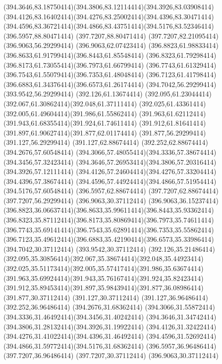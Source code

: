 {{	\curveto(394.3646,83.18750414)(394.3806,83.12114414)(394.3926,83.03908414)
	\curveto(394.4126,83.16402414)(394.4276,83.25002414)(394.4396,83.30471414)
	\curveto(394.4596,83.36721414)(394.4866,83.43751414)(394.5176,83.52346414)
	\lineto(396.5957,88.80471414)
	\lineto(397.7207,88.80471414)
	\lineto(397.7207,82.21095414)
	\closepath
	\moveto(396.9063,56.29299414)
	\lineto(396.9063,62.07423414)
	\curveto(396.8823,61.98833414)(396.8633,61.91799414)(396.8443,61.85548414)
	\curveto(396.8323,61.79298414)(396.8173,61.73055414)(396.7973,61.66799414)
	\curveto(396.7743,61.61329414)(396.7543,61.55079414)(396.7353,61.48048414)
	\curveto(396.7123,61.41798414)(396.6883,61.34376414)(396.6573,61.26174414)
	\lineto(394.7042,56.29299414)
	\lineto(393.9542,56.29299414)
	\lineto(392.126,61.13674414)
	\curveto(392.095,61.23044414)(392.067,61.30862414)(392.048,61.37111414)
	\curveto(392.025,61.43361414)(392.005,61.49604414)(391.986,61.55862414)
	\curveto(391.963,61.62112414)(391.943,61.68355414)(391.924,61.74611414)
	\curveto(391.912,61.81641414)(391.897,61.90627414)(391.877,62.01174414)
	\lineto(391.877,56.29299414)
	\lineto(391.127,56.29299414)
	\lineto(391.127,62.88674414)
	\lineto(392.252,62.88674414)
	\lineto(394.2676,57.60548414)
	\curveto(394.3066,57.48055414)(394.3336,57.38674414)(394.3456,57.32423414)
	\curveto(394.3646,57.26953414)(394.3806,57.20316414)(394.3926,57.12111414)
	\curveto(394.4126,57.24604414)(394.4276,57.33204414)(394.4396,57.38674414)
	\curveto(394.4596,57.44924414)(394.4866,57.51954414)(394.5176,57.60548414)
	\lineto(396.5957,62.88674414)
	\lineto(397.7207,62.88674414)
	\lineto(397.7207,56.29299414)
	\closepath
	\moveto(396.9063,30.37112414)
	\lineto(396.9063,36.15237414)
	\curveto(396.8823,36.06637414)(396.8633,35.99611414)(396.8443,35.93362414)
	\curveto(396.8323,35.87112414)(396.8173,35.80869414)(396.7973,35.74611414)
	\curveto(396.7743,35.69141414)(396.7543,35.62891414)(396.7353,35.55862414)
	\curveto(396.7123,35.49612414)(396.6883,35.42190414)(396.6573,35.33986414)
	\lineto(394.7042,30.37112414)
	\lineto(393.9542,30.37112414)
	\lineto(392.126,35.21486414)
	\curveto(392.095,35.30856414)(392.067,35.38674414)(392.048,35.44923414)
	\curveto(392.025,35.51173414)(392.005,35.57417414)(391.986,35.63674414)
	\curveto(391.963,35.69924414)(391.943,35.76167414)(391.924,35.82423414)
	\curveto(391.912,35.89453414)(391.897,35.98439414)(391.877,36.08986414)
	\lineto(391.877,30.37112414)
	\lineto(391.127,30.37112414)
	\lineto(391.127,36.96486414)
	\lineto(392.252,36.96486414)
	\lineto(394.2676,31.68362414)
	\curveto(394.3066,31.55872414)(394.3336,31.46492414)(394.3456,31.40242414)
	\curveto(394.3646,31.34742414)(394.3806,31.28132414)(394.3926,31.19922414)
	\curveto(394.4126,31.32422414)(394.4276,31.41022414)(394.4396,31.46492414)
	\curveto(394.4596,31.52692414)(394.4866,31.59772414)(394.5176,31.68362414)
	\lineto(396.5957,36.96486414)
	\lineto(397.7207,36.96486414)
	\lineto(397.7207,30.37112414)
	\closepath
	\moveto(396.9063,30.37112414)
}
}
